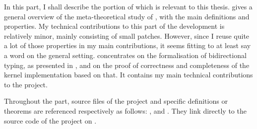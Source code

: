 In this part, I shall describe the portion of  which is relevant to this thesis.
 gives a general overview of the meta-theoretical study of ,
with the main definitions and properties.
My technical contributions to this part of the development is relatively minor,
mainly consisting of small patches. However, since I reuse quite a lot of those properties
in my main contributions, it seems fitting to at least say a word on the general setting.
 concentrates on the formalisation of bidirectional typing, as
presented in , and on the proof of correctness and completeness of
the kernel implementation based on that. It contains my main technical
contributions to the  project.

Throughout the part, source files of the  project
and specific definitions or theorems are referenced respectively as follows:
, and . They link directly to the source
code of the project on .